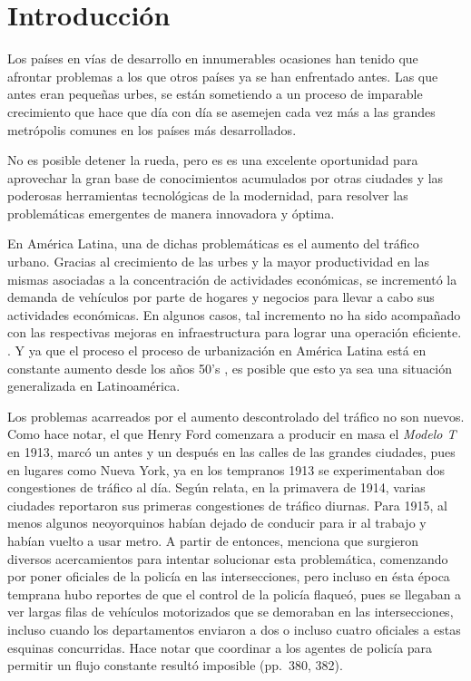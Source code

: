 
\chapter{Introducción} %
\graphicspath{{./../imagenes/}}
\linespread{1.3}
Los países en vías de desarrollo en innumerables ocasiones han tenido
que afrontar problemas a los que otros países ya se han enfrentado
antes. Las que antes eran pequeñas urbes, se están sometiendo a un
proceso de imparable crecimiento que hace que día con día se asemejen
cada vez más a las grandes metrópolis comunes en los países más
desarrollados.

No es posible detener la rueda, pero es es una excelente oportunidad
para aprovechar la gran base de conocimientos acumulados por otras
ciudades y las poderosas herramientas tecnológicas de la modernidad,
para resolver las problemáticas emergentes de manera innovadora y
óptima.

En América Latina, una de dichas problemáticas es el aumento del tráfico
urbano. Gracias al crecimiento de las urbes y la mayor productividad en
las mismas asociadas a la concentración de actividades económicas, se
incrementó la demanda de vehículos por parte de hogares y negocios para
llevar a cabo sus actividades económicas. En algunos casos, tal
incremento no ha sido acompañado con las respectivas mejoras en
infraestructura para lograr una operación eficiente.
\parencite[1]{Medina-Durango2011}. Y ya que el proceso el proceso de
urbanización en América Latina está en constante aumento desde los años
50's \parencite[27]{PdaCunha2009}, es posible que esto ya sea una
situación generalizada en Latinoamérica.

Los problemas acarreados por el aumento descontrolado del tráfico no son
nuevos. Como \textcite{McShane1999} hace notar, el que Henry Ford
comenzara a producir en masa el \emph{Modelo T} en 1913, marcó un antes
y un después en las calles de las grandes ciudades, pues en lugares como
Nueva York, ya en los tempranos 1913 se experimentaban dos congestiones
de tráfico al día. Según relata, en la primavera de 1914, varias
ciudades reportaron sus primeras congestiones de tráfico diurnas. Para
1915, al menos algunos neoyorquinos habían dejado de conducir para ir al
trabajo y habían vuelto a usar metro. A partir de entonces, menciona que
surgieron diversos acercamientos para intentar solucionar esta
problemática, comenzando por poner oficiales de la policía en las
intersecciones, pero incluso en ésta época temprana hubo reportes de que
el control de la policía flaqueó, pues se llegaban a ver largas filas de
vehículos motorizados que se demoraban en las intersecciones, incluso
cuando los departamentos enviaron a dos o incluso cuatro oficiales a
estas esquinas concurridas. Hace notar que coordinar a los agentes de
policía para permitir un flujo constante resultó imposible (pp.~380,
382).


